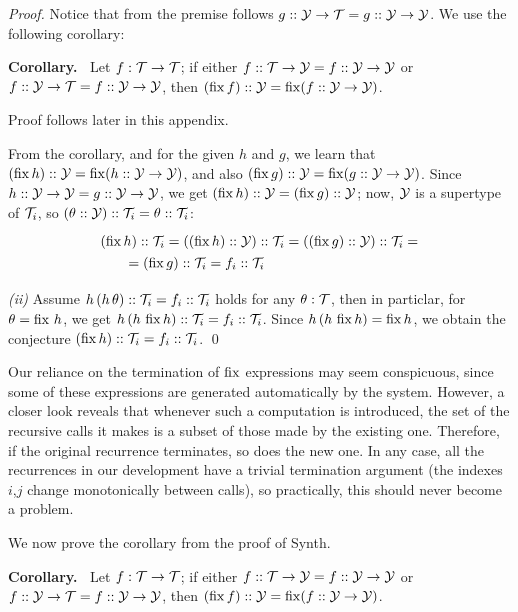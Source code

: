 \begin{proof}
Notice that from the premise follows $g :: \mathcal{Y}\to\mathcal{T} = g :: \mathcal{Y}\to\mathcal{Y}$. We use the following corollary:

\medskip\noindent
{\bf Corollary.~} Let $f : \mathcal{T}\to\mathcal{T}$; if either $f :: \mathcal{T}\to\mathcal{Y} = f :: \mathcal{Y}\to\mathcal{Y}$ or $f :: \mathcal{Y}\to\mathcal{T} = f :: \mathcal{Y}\to\mathcal{Y}$, 
then $(\operatorname{fix} f)::\mathcal{Y} = \operatorname{fix} (f :: \mathcal{Y}\to\mathcal{Y})$.

Proof follows later in this appendix.

\medskip
From the corollary, and for the given $h$ and $g$, we learn that $(\operatorname{fix} h)::\mathcal{Y} = \operatorname{fix}(h::\mathcal{Y}\to\mathcal{Y})$,
and also $(\operatorname{fix} g)::\mathcal{Y}=\operatorname{fix}(g::\mathcal{Y}\to\mathcal{Y})$. Since $h::\mathcal{Y}\to\mathcal{Y}=g::\mathcal{Y}\to\mathcal{Y}$,
we get $(\operatorname{fix} h)::\mathcal{Y} = (\operatorname{fix} g)::\mathcal{Y}$; now, $\mathcal{Y}$ is a supertype of $\mathcal{T}_i$, so $(\theta::\mathcal{Y})::\mathcal{T}_i=\theta::\mathcal{T}_i$:
\[\renewcommand\arraystretch{1.3}
  \begin{array}{l}(\fix h)::\T_i = ((\fix h)::\Y)::\T_i = ((\fix g)::\Y)::\T_i = \\
    \qquad = (\fix g)::\T_i=f_i::\T_i
  \end{array}\]

{\it (ii)} Assume $h\,(h\,\theta) :: \mathcal{T}_i = f_i :: \mathcal{T}_i$ holds for any $\theta:\mathcal{T}$,
then in particlar, for $\theta=\operatorname{fix}\,h$, we get $h\,(h\,\operatorname{fix} h) :: \mathcal{T}_i = f_i :: \mathcal{T}_i$.
Since $h\,(h\,\operatorname{fix} h) = \operatorname{fix} h$, we obtain the conjecture $(\operatorname{fix} h) :: \mathcal{T}_i = f_i :: \mathcal{T}_i$.
\qed
\end{proof}

\medskip
Our reliance on the termination of $\operatorname{fix}$ expressions may seem conspicuous, since some of these
expressions are generated automatically by the system. However, a closer look reveals that whenever
such a computation is introduced, the set of the recursive calls it makes is a subset of those made by the existing one.
Therefore, if the original recurrence terminates, so does the new one. In any case, all the recurrences
in our development have a trivial termination argument (the indexes $i$,$j$ change monotonically between calls),
so practically, this should never become a problem.

\bigskip

We now prove the corollary from the proof of {\sf Synth}.

\medskip\noindent
{\bf Corollary.~} Let $f : \mathcal{T}\to\mathcal{T}$; if either $f :: \mathcal{T}\to\mathcal{Y} = f :: \mathcal{Y}\to\mathcal{Y}$ or $f :: \mathcal{Y}\to\mathcal{T} = f :: \mathcal{Y}\to\mathcal{Y}$, 
then $(\operatorname{fix} f)::\mathcal{Y} = \operatorname{fix} (f :: \mathcal{Y}\to\mathcal{Y})$.


